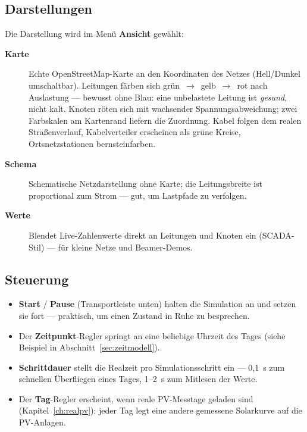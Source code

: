 \documentclass[11pt,a4paper,parskip=half]{scrreprt}
\newcommand{\ui}[1]{\textsf{\bfseries #1}}          %
\begin{document}
\subsection{Darstellungen}

Die Darstellung wird im Menü \ui{Ansicht} gewählt:

\begin{description}
  \item[\ui{Karte}] Echte OpenStreetMap-Karte an den Koordinaten des
    Netzes (Hell/Dunkel umschaltbar). Leitungen färben sich
    grün~$\rightarrow$~gelb~$\rightarrow$~rot nach Auslastung ---
    bewusst ohne Blau: eine unbelastete Leitung ist \emph{gesund},
    nicht \glqq kalt\grqq. Knoten röten sich mit wachsender
    Spannungsabweichung; zwei Farbskalen am Kartenrand liefern die
    Zuordnung. Kabel folgen dem realen Straßenverlauf,
    Kabelverteiler erscheinen als grüne Kreise, Ortsnetzstationen
    bernsteinfarben.
  \item[\ui{Schema}] Schematische Netzdarstellung ohne Karte; die
    Leitungsbreite ist proportional zum Strom --- gut, um
    Lastpfade zu verfolgen.
  \item[\ui{Werte}] Blendet Live-Zahlenwerte direkt an Leitungen und
    Knoten ein (SCADA-Stil) --- für kleine Netze und Beamer-Demos.
\end{description}

\subsection{Steuerung}

\begin{itemize}[nosep]
  \item \ui{Start} / \ui{Pause} (Transportleiste unten) halten die
    Simulation an und setzen sie fort --- praktisch, um einen
    Zustand in Ruhe zu besprechen.
  \item Der \ui{Zeitpunkt}-Regler springt an eine beliebige Uhrzeit
    des Tages (siehe Beispiel in Abschnitt~\ref{sec:zeitmodell}).
  \item \ui{Schrittdauer} stellt die Realzeit pro Simulationsschritt
    ein --- 0{,}1~s zum schnellen Überfliegen eines Tages, 1--2~s
    zum Mitlesen der Werte.
  \item Der \ui{Tag}-Regler erscheint, wenn reale PV-Messtage geladen
    sind (Kapitel~\ref{ch:realpv}): jeder Tag legt eine andere
    gemessene Solarkurve auf die PV-Anlagen.
\end{itemize}
\end{document}
